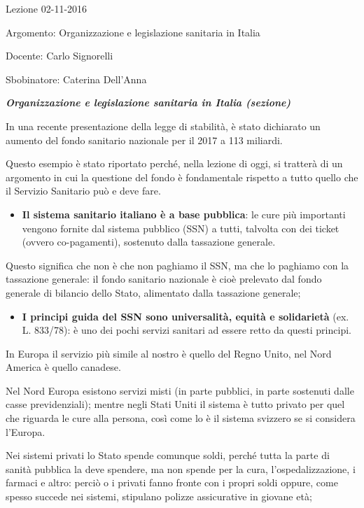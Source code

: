 \documentclass[]{article}
\date{}
\begin{document}
Lezione 02-11-2016

Argomento: Organizzazione e legislazione sanitaria in Italia

Docente: Carlo Signorelli

Sbobinatore: Caterina Dell'Anna

\emph{\textbf{Organizzazione e legislazione sanitaria in Italia
(sezione)}}

In una recente presentazione della legge di stabilità, è stato
dichiarato un aumento del fondo sanitario nazionale per il 2017 a 113
miliardi.

Questo esempio è stato riportato perché, nella lezione di oggi, si
tratterà di un argomento in cui la questione del fondo è fondamentale
rispetto a tutto quello che il Servizio Sanitario può e deve fare.

\begin{itemize}
\item
  \textbf{Il sistema sanitario italiano è a base pubblica}: le cure più
  importanti vengono fornite dal sistema pubblico (SSN) a tutti,
  talvolta con dei ticket (ovvero co-pagamenti), sostenuto dalla
  tassazione generale.
\end{itemize}

Questo significa che non è che non paghiamo il SSN, ma che lo paghiamo
con la tassazione generale: il fondo sanitario nazionale è cioè
prelevato dal fondo generale di bilancio dello Stato, alimentato dalla
tassazione generale;

\begin{itemize}
\item
  \textbf{I principi guida del SSN sono universalità, equità e
  solidarietà} (ex. L. 833/78): è uno dei pochi servizi sanitari ad
  essere retto da questi principi.
\end{itemize}

In Europa il servizio più simile al nostro è quello del Regno Unito, nel
Nord America è quello canadese.

Nel Nord Europa esistono servizi misti (in parte pubblici, in parte
sostenuti dalle casse previdenziali); mentre negli Stati Uniti il
sistema è tutto privato per quel che riguarda le cure alla persona, così
come lo è il sistema svizzero se si considera l'Europa.

Nei sistemi privati lo Stato spende comunque soldi, perché tutta la
parte di sanità pubblica la deve spendere, ma non spende per la cura,
l'ospedalizzazione, i farmaci e altro: perciò o i privati fanno fronte
con i propri soldi oppure, come spesso succede nei sistemi, stipulano
polizze assicurative in giovane età;
\end{document}
